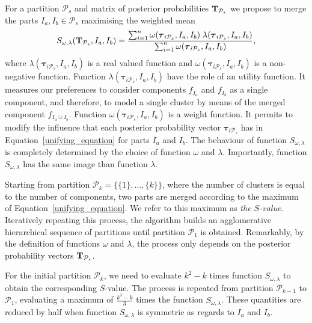 \documentclass[submit]{smj}
\theoremstyle{definition}
\newcommand{\m}[1]{\boldsymbol{#1}}
\begin{document}
For a partition $\mathcal{P}_s$  and matrix of posterior probabilities $\text{\textbf{T}}_{\mathcal{P}_s}$ we propose to merge the parts $I_a, I_b \in \mathcal{P}_s$ maximising the weighted mean
\begin{equation}\label{unifying_equation}
S_{\omega, \lambda}( \text{\textbf{T}}_{\mathcal{P}_s},  I_a,  I_b) = \frac{\sum_{i=1}^n \omega(\m\tau_{i \mathcal{P}_s}, I_a, I_b) \; \lambda(\m\tau_{i \mathcal{P}_s}, I_a, I_b)}{\sum_{i=1}^n \omega(\m\tau_{i \mathcal{P}_s}, I_a, I_b) },
\end{equation}
where $\lambda(\m\tau_{i \mathcal{P}_s}, I_a, I_b)$ is a real valued function and $\omega(\m\tau_{i \mathcal{P}_s}, I_a, I_b)$ is a non-negative function.  Function $\lambda(\m\tau_{i \mathcal{P}_s},  I_a,  I_b)$ have the role of an utility function. It measures our preferences to consider components $f_{I_a}$ and $f_{I_b}$ as a single component, and therefore, to model a single cluster by means of the merged component $f_{I_a \cup I_b}$. Function $\omega(\m\tau_{i \mathcal{P}_s},  I_a,  I_b)$ is a weight function. It permits to modify the influence that each posterior probability vector $\m\tau_{i \mathcal{P}_s}$ has in Equation~\ref{unifying_equation} for parts $I_a$ and $I_b$. The behaviour of function $S_{\omega, \lambda}$ is completely determined by the choice of function $\omega$ and $\lambda$. Importantly, function $S_{\omega, \lambda}$ has the same image than function $\lambda$.


Starting from partition $\mathcal{P}_k = \{ \{1\}, \dots, \{k\} \}$, where the number of clusters is equal to the number of components, two parts are merged according to the maximum of Equation~\ref{unifying_equation}. We refer to this maximum as \emph{the $S$-value}. Iteratively repeating this process, the algorithm builds an agglomerative hierarchical sequence of partitions until partition $\mathcal{P}_1$ is obtained. Remarkably, by the definition of functions $\omega$ and $\lambda$, the process only depends on the posterior probability vectors $\text{\textbf{T}}_{\mathcal{P}_s}$.

For the initial partition $\mathcal{P}_k$, we need to evaluate $k^2-k$ times function $S_{\omega, \lambda}$ to obtain  the corresponding $S$-value. The process is repeated from partition $\mathcal{P}_{k-1}$ to $\mathcal{P}_1$, evaluating a maximum of $\frac{k^3-k}{3}$ times the function $S_{\omega, \lambda}$. These quantities are reduced by half when function $S_{\omega, \lambda}$ is symmetric as regards to $I_a$ and $I_b$. 
\end{document}
